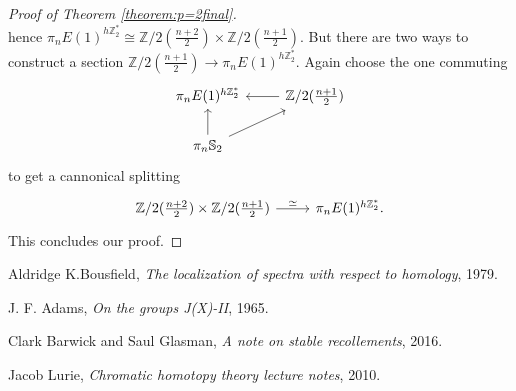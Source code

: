 \documentclass[a4paper]{article} %
\theoremstyle{definition}
\newcommand{\Z}{\mathbb{Z}}
\newcommand{\Sph}{\mathbb{S}}
\begin{document}
\begin{proof}[Proof of Theorem \ref{theorem:p=2final}]
\[  \]
  hence $\pi_nE(1)^{h\Z_2^*} \cong \Z/2(\frac{n+2}{2}) \times \Z/2 (\frac{n+1}{2})$. But there are two ways to construct a section $\Z/2(\frac{n+1}{2}) \to \pi_nE(1)^{h\Z_2^*}$. Again choose the one commuting
  \[
  \begin{tikzcd}
    \pi_nE(1)^{h\Z_2^*} & \Z/2(\frac{n+1}{2}) \lar \\
    \pi_n \Sph_2 \arrow{u} \arrow{ur} &
  \end{tikzcd}
  \]
  to get a cannonical splitting
  \[
  \begin{tikzcd}
    \Z/2(\frac{n+2}{2}) \times \Z/2(\frac{n+1}{2}) \rar{\simeq} & \pi_nE(1)^{h\Z_2^*}.
  \end{tikzcd}
  \]
  This concludes our proof.
\end{proof}

\begin{thebibliography}{9}

  Aldridge K.Bousfield,
  \textit{The localization of spectra with respect to homology},
  1979.

  J. F. Adams,
  \textit{On the groups J(X)-II},
  1965.

    Clark Barwick and Saul Glasman,
    \textit{A note on stable recollements},
    2016.

  Jacob Lurie,
  \textit{Chromatic homotopy theory lecture notes},
  2010.

\end{thebibliography}
\end{document}
